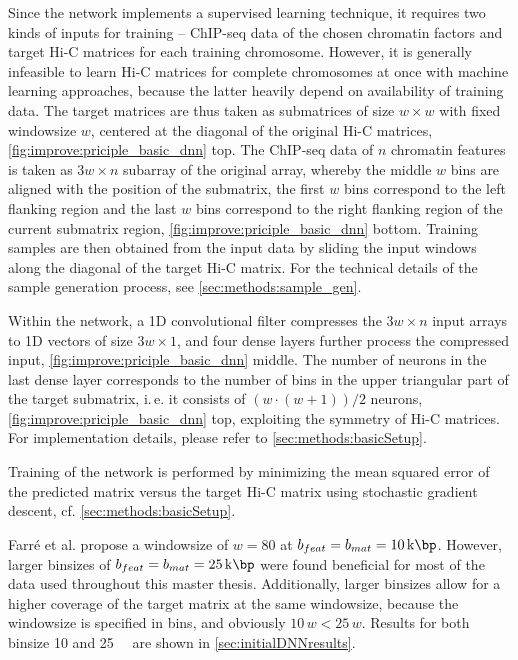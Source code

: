 Since the network implements a supervised learning technique,
it requires two kinds of inputs for training -- ChIP-seq data of the chosen chromatin factors and
target Hi-C matrices for each training chromosome.
However, it is generally infeasible to learn Hi-C matrices for complete chromosomes at once with machine learning approaches, 
because the latter heavily depend on availability of training data.
The target matrices are thus taken as submatrices of size $w \times w$ 
with fixed windowsize $w$, centered at the diagonal of the 
original Hi-C matrices, \cref{fig:improve:priciple_basic_dnn} top.
The ChIP-seq data of $n$ chromatin features is taken as $3w \times n$ subarray of the original array,
whereby the middle $w$ bins are aligned with the position of the submatrix,
the first $w$ bins correspond to the left flanking region and the last $w$ bins correspond to 
the right flanking region of the current submatrix region, \cref{fig:improve:priciple_basic_dnn} bottom. 
Training samples are then obtained from the input data by sliding 
the input windows along the diagonal of the target Hi-C matrix. 
For the technical details of the sample generation process, see \cref{sec:methods:sample_gen}.

Within the network, a 1D convolutional filter compresses the $3w \times n$ input arrays to 1D vectors
of size $3w \times 1$, and four dense layers further process the compressed input, \cref{fig:improve:priciple_basic_dnn} middle.
The number of neurons in the last dense layer corresponds to the number of bins
in the upper triangular part of the target submatrix, i.\,e. it consists of $(w \cdot (w+1))/2$ neurons, \cref{fig:improve:priciple_basic_dnn} top, 
exploiting the symmetry of Hi-C matrices. 
For implementation details, please refer to \cref{sec:methods:basicSetup}.

Training of the network is performed by minimizing the mean squared error of the predicted matrix
versus the target Hi-C matrix using stochastic gradient descent, cf. \cref{sec:methods:basicSetup}.

Farr\'e et al. propose a windowsize of $w=80$ at $b_{feat} = b_{mat} = \SI{10}{\kilo\bp}$.
However, larger binsizes of $b_{feat} = b_{mat} = \SI{25}{\kilo\bp}$ were found beneficial for 
most of the data used throughout this master thesis.
Additionally, larger binsizes allow for a higher coverage of the target matrix at the same windowsize,
because the windowsize is specified in bins, and obviously $10\, w < 25\, w$.
Results for both binsize 10 and \SI{25}{\kilo\bp} are shown in \cref{sec:initialDNNresults}.

